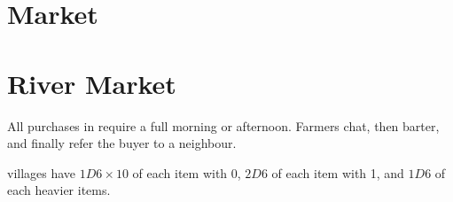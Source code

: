 \ifodd\value{diceNo}
  \section*{ Market}
\else
  \section*{River  Market}
\fi

\noindent
All purchases in  require a full morning or afternoon.
Farmers chat, then barter, and finally refer the buyer to a neighbour.

\Glspl{village} have $1D6\times 10$ of each item with  0, $2D6$ of each item with  1, and $1D6$ of each heavier items.

